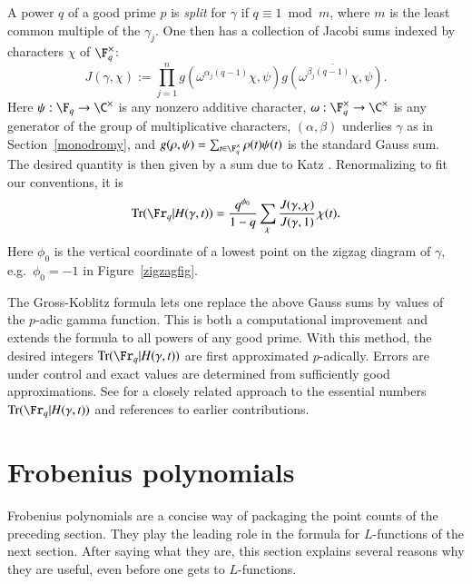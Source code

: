 \documentclass{notices}
\numberwithin{equation}{section}
\numberwithin{table}{section}
\numberwithin{figure}{section}
\DeclareMathOperator{\Tr}{Tr}
\begin{document}
{   
A power $q$ of a good prime $p$ is {\em split} for $\gamma$ if $q\equiv 1 \bmod m$,
where $m$ is the least common multiple of the $\gamma_j$.   One then 
 has a collection of Jacobi sums indexed by characters $\chi$ of $\F^\times_q$:
\[
J(\gamma,\chi) := \prod_{j=1}^n g(\omega^{\alpha_j (q-1)} \chi,\psi) \overline{g(\omega^{\beta_j (q-1)} \chi,\psi)}.
\]
Here $\psi: \F_q \rightarrow \C^\times$ is any nonzero additive character, $\omega: \F_q^\times \rightarrow \C^\times$ is
any generator of the group of multiplicative characters, $(\alpha,\beta)$ underlies $\gamma$ as in
Section~\ref{monodromy}, and $g(\rho,\psi)=\sum_{t\in\F_q^\times} \rho(t)\psi(t)$ is the standard Gauss sum.
The desired quantity is then given by a
sum 
due to Katz \cite[p.\ 258]{Katz-ESDE}.  Renormalizing to fit our conventions, it
is 
\begin{equation}
\label{hyperg-trace}
\Tr(\Fr_q|H(\gamma,t)) = 
\frac {q^{\phi_0}}{1-q}\sum_\chi
\frac{J(\gamma,\chi)}{J(\gamma,1)} 
\,\chi(t).
\end{equation}
Here $\phi_0$ is the vertical coordinate
of a lowest point on the zigzag diagram of $\gamma$, e.g.\ $\phi_0=-1$ in
Figure~\ref{zigzagfig}. 


The Gross-Koblitz formula lets one 
replace the above Gauss sums by values
of the $p$-adic gamma function.  This is both 
a computational improvement and extends the formula to 
all powers of any good prime.  
With this method, the desired integers $\Tr(\Fr_q|H(\gamma,t))$ 
are first approximated $p$-adically.  Errors are under control and
exact values are determined from sufficiently good approximations. 
See \cite{BCM} 
for a closely related approach to the essential numbers $\Tr(\Fr_q|H(\gamma,t))$ 
and references to earlier contributions.   

\section{Frobenius polynomials} 
\label{frobenius}
 Frobenius 
polynomials are a concise way of packaging
the point counts of the preceding section.  
They play the leading role in the formula
for $L$-functions of the next section.   
After saying what they are, this section explains several reasons 
why they are useful, even before 
one gets to $L$-functions.

}
\end{document}
